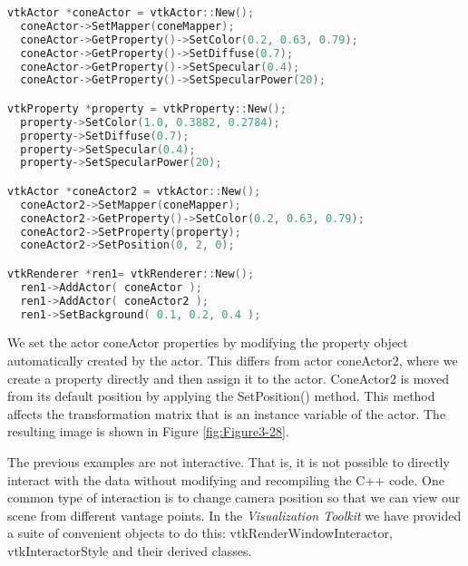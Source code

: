 \begin{description}[leftmargin=0cm,labelindent=0cm]
\begin{lstlisting}[language=C++, caption={Cone4.cxx}]
vtkActor *coneActor = vtkActor::New();
  coneActor->SetMapper(coneMapper);
  coneActor->GetProperty()->SetColor(0.2, 0.63, 0.79);
  coneActor->GetProperty()->SetDiffuse(0.7);
  coneActor->GetProperty()->SetSpecular(0.4);
  coneActor->GetProperty()->SetSpecularPower(20);

vtkProperty *property = vtkProperty::New();
  property->SetColor(1.0, 0.3882, 0.2784);
  property->SetDiffuse(0.7);
  property->SetSpecular(0.4);
  property->SetSpecularPower(20);

vtkActor *coneActor2 = vtkActor::New();
  coneActor2->SetMapper(coneMapper);
  coneActor2->GetProperty()->SetColor(0.2, 0.63, 0.79);
  coneActor2->SetProperty(property);
  coneActor2->SetPosition(0, 2, 0);

vtkRenderer *ren1= vtkRenderer::New();
  ren1->AddActor( coneActor );
  ren1->AddActor( coneActor2 );
  ren1->SetBackground( 0.1, 0.2, 0.4 );
\end{lstlisting}

We set the actor coneActor properties by modifying the property object automatically created by the actor. This differs from actor coneActor2, where we create a property directly and then assign it to the actor. ConeActor2 is moved from its default position by applying the SetPosition() method. This method affects the transformation matrix that is an instance variable of the actor. The resulting image is shown in Figure \ref{fig:Figure3-28}.

\item[Introducing vtkRenderWindowInteractor]
\label{subsec:examples_introducing_vtkRenderWindowInteractor}

The previous examples are not interactive. That is, it is not possible to directly interact with the data without modifying and recompiling the C++ code. One common type of interaction is to change camera position so that we can view our scene from different vantage points. In the \emph{Visualization Toolkit} we have provided a suite of convenient objects to do this: vtkRenderWindowInteractor, vtkInteractorStyle and their derived classes.


\end{description}
